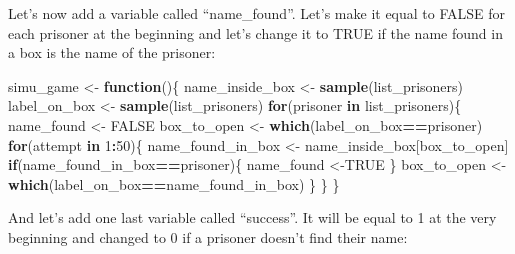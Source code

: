 \documentclass[]{book}
\newenvironment{Shaded}{\begin{snugshade}}{\end{snugshade}}
\newcommand{\ControlFlowTok}[1]{\textcolor[rgb]{0.13,0.29,0.53}{\textbf{#1}}}
\newcommand{\DecValTok}[1]{\textcolor[rgb]{0.00,0.00,0.81}{#1}}
\newcommand{\KeywordTok}[1]{\textcolor[rgb]{0.13,0.29,0.53}{\textbf{#1}}}
\newcommand{\NormalTok}[1]{#1}
\newcommand{\OperatorTok}[1]{\textcolor[rgb]{0.81,0.36,0.00}{\textbf{#1}}}
\newcommand{\OtherTok}[1]{\textcolor[rgb]{0.56,0.35,0.01}{#1}}
\newcommand{\StringTok}[1]{\textcolor[rgb]{0.31,0.60,0.02}{#1}}
\begin{document}
Let's now add a variable called ``name\_found''. Let's make it equal to FALSE for each prisoner at the beginning and let's change it to TRUE if the name found in a box is the name of the prisoner:

\begin{Shaded}
\begin{Highlighting}[]
\NormalTok{simu_game <-}\StringTok{ }\ControlFlowTok{function}\NormalTok{()\{}
\NormalTok{  name_inside_box <-}\StringTok{ }\KeywordTok{sample}\NormalTok{(list_prisoners)}
\NormalTok{  label_on_box <-}\StringTok{ }\KeywordTok{sample}\NormalTok{(list_prisoners)}
  \ControlFlowTok{for}\NormalTok{(prisoner }\ControlFlowTok{in}\NormalTok{ list_prisoners)\{}
\NormalTok{    name_found <-}\StringTok{ }\OtherTok{FALSE}
\NormalTok{    box_to_open <-}\StringTok{ }\KeywordTok{which}\NormalTok{(label_on_box}\OperatorTok{==}\NormalTok{prisoner)}
    \ControlFlowTok{for}\NormalTok{(attempt }\ControlFlowTok{in} \DecValTok{1}\OperatorTok{:}\DecValTok{50}\NormalTok{)\{}
\NormalTok{      name_found_in_box <-}\StringTok{ }\NormalTok{name_inside_box[box_to_open]}
      \ControlFlowTok{if}\NormalTok{(name_found_in_box}\OperatorTok{==}\NormalTok{prisoner)\{}
\NormalTok{        name_found <-}\OtherTok{TRUE}
\NormalTok{      \}}
\NormalTok{      box_to_open <-}\StringTok{ }\KeywordTok{which}\NormalTok{(label_on_box}\OperatorTok{==}\NormalTok{name_found_in_box) }
\NormalTok{    \}}
\NormalTok{  \}}
\NormalTok{\}}
\end{Highlighting}
\end{Shaded}

And let's add one last variable called ``success''. It will be equal to 1 at the very beginning and changed to 0 if a prisoner doesn't find their name:
\end{document}
